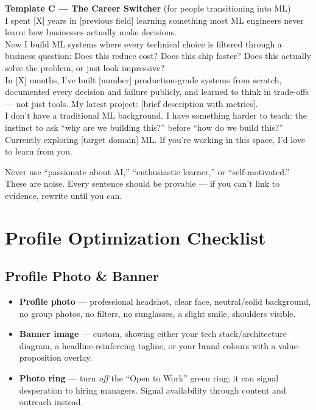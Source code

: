 \begin{template}
\textbf{Template C --- The Career Switcher} (for people transitioning into ML)\\[4pt]
I spent [X] years in [previous field] learning something most ML engineers never learn: how businesses actually
make decisions.\\[4pt]
Now I build ML systems where every technical choice is filtered through a business question: Does this reduce
cost? Does this ship faster? Does this actually solve the problem, or just look impressive?\\[4pt]
In [X] months, I've built [number] production-grade systems from scratch, documented every decision and failure
publicly, and learned to think in trade-offs --- not just tools. My latest project: [brief description with
metrics].\\[4pt]
I don't have a traditional ML background. I have something harder to teach: the instinct to ask ``why are we
building this?'' before ``how do we build this?''\\[4pt]
Currently exploring [target domain] ML. If you're working in this space, I'd love to learn from you.
\end{template}

\begin{keytakeaway}
Never use ``passionate about AI,'' ``enthusiastic learner,'' or ``self-motivated.'' These are noise. Every
sentence should be provable --- if you can't link to evidence, rewrite until you can.
\end{keytakeaway}

\section{Profile Optimization Checklist}

\subsection{Profile Photo \& Banner}

\begin{itemize}
  \item \textbf{Profile photo} --- professional headshot, clear face, neutral/solid background, no group photos,
  no filters, no sunglasses, a slight smile, shoulders visible.
  \item \textbf{Banner image} --- custom, showing either your tech stack/architecture diagram, a
  headline-reinforcing tagline, or your brand colours with a value-proposition overlay.
  \item \textbf{Photo ring} --- turn \emph{off} the ``Open to Work'' green ring; it can signal desperation to
  hiring managers. Signal availability through content and outreach instead.
\end{itemize}

